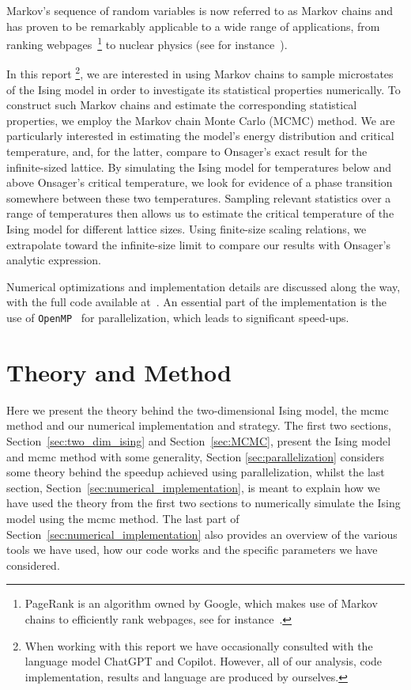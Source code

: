 \documentclass[english,notitlepage,reprint]{revtex4-2}  %
\begin{document}
Markov's sequence of random variables is now referred to as Markov chains and has proven to be remarkably applicable to a wide range of applications, from ranking webpages~\footnote{PageRank is an algorithm owned by Google, which makes use of Markov chains to efficiently rank webpages, see for instance~\cite{borkar2025smallnoiselimitsmarkov}.} to nuclear physics (see for instance~\cite{HALASZ2018429}). 

In this report \footnote{When working with this report we have occasionally consulted with the language model ChatGPT and Copilot. 
However, all of our analysis, code implementation, results and language are produced by ourselves.}, we are interested in using Markov chains to sample microstates of the Ising model in order to investigate its statistical properties numerically.
To construct such Markov chains and estimate the corresponding statistical properties, we employ the Markov chain Monte Carlo (MCMC) method.
We are particularly interested in estimating the model's energy distribution and critical temperature, and, for the latter, compare to Onsager's exact result for the infinite-sized lattice. 
By simulating the Ising model for temperatures below and above Onsager's critical temperature, we look for evidence of a phase transition somewhere between these two temperatures.
Sampling relevant statistics over a range of temperatures then allows us to estimate the critical temperature of the Ising model for different lattice sizes.
Using finite-size scaling relations, we extrapolate toward the infinite-size limit to compare our results with Onsager's analytic expression.

Numerical optimizations and implementation details are discussed along the way, with the full code available at~\cite{FYS4150Project4}.
An essential part of the implementation is the use of \texttt{OpenMP}~\cite{openmp} for parallelization, which leads to significant speed-ups.

\section{Theory and Method} \label{sec:theory_and_method}
Here we present the theory behind the two-dimensional Ising model, the \gls{mcmc} method and our numerical implementation and strategy.
The first two sections, Section~\ref{sec:two_dim_ising} and Section~\ref{sec:MCMC}, present the Ising model and \gls{mcmc} method with some generality, Section \ref{sec:parallelization} considers some theory behind the speedup achieved using parallelization, whilst the last section, Section~\ref{sec:numerical_implementation}, is meant to explain how we have used the theory from the first two sections to numerically simulate the Ising model using the \gls{mcmc} method.
The last part of Section~\ref{sec:numerical_implementation} also provides an overview of the various tools we have used, how our code works and the specific parameters we have considered. 
\end{document}
